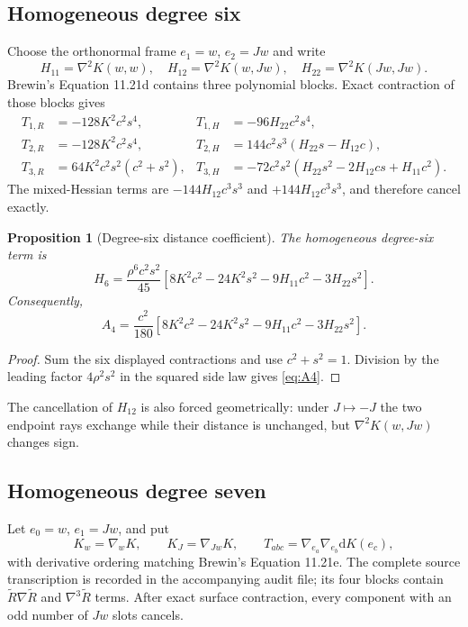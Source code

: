 \documentclass[11pt]{amsart}
\numberwithin{equation}{section}
\newtheorem{proposition}[theorem]{Proposition}
\theoremstyle{remark}
\newcommand{\BRiem}{\widetilde{R}}
\newcommand{\Hess}{\nabla^2}
\newcommand{\dd}{\mathrm{d}}
\begin{document}
\subsection{Homogeneous degree six}
Choose the orthonormal frame $e_1=w$, $e_2=Jw$ and write
\[
 H_{11}=\Hess K(w,w),\quad H_{12}=\Hess K(w,Jw),\quad H_{22}=\Hess K(Jw,Jw).
\]
Brewin's Equation 11.21d contains three polynomial blocks.  Exact contraction of those blocks gives
\begin{align*}
T_{1,R}&=-128K^2c^2s^4,
& T_{1,H}&=-96H_{22}c^2s^4,\\
T_{2,R}&=-128K^2c^2s^4,
& T_{2,H}&=144c^2s^3(H_{22}s-H_{12}c),\\
T_{3,R}&=64K^2c^2s^2(c^2+s^2),
& T_{3,H}&=-72c^2s^2(H_{22}s^2-2H_{12}cs+H_{11}c^2).
\end{align*}
The mixed-Hessian terms are $-144H_{12}c^3s^3$ and $+144H_{12}c^3s^3$, and therefore cancel exactly.

\begin{proposition}[Degree-six distance coefficient]\label{prop:H6}
The homogeneous degree-six term is
\begin{equation}\label{eq:H6}
 H_6=\frac{\rho^6c^2s^2}{45}
 \left[8K^2c^2-24K^2s^2-9H_{11}c^2-3H_{22}s^2\right].
\end{equation}
Consequently,
\begin{equation}\label{eq:A4}
 A_4=\frac{c^2}{180}
 \left[8K^2c^2-24K^2s^2-9H_{11}c^2-3H_{22}s^2\right].
\end{equation}
\end{proposition}

\begin{proof}
Sum the six displayed contractions and use $c^2+s^2=1$.  Division by the leading factor $4\rho^2s^2$ in the squared side law gives \eqref{eq:A4}.
\end{proof}

The cancellation of $H_{12}$ is also forced geometrically: under $J\mapsto-J$ the two endpoint rays exchange while their distance is unchanged, but $\Hess K(w,Jw)$ changes sign.

\subsection{Homogeneous degree seven}
Let $e_0=w$, $e_1=Jw$, and put
\[
 K_w=\nabla_wK,
 \qquad K_J=\nabla_{Jw}K,
 \qquad T_{abc}=\nabla_{e_a}\nabla_{e_b}\dd K(e_c),
\]
with derivative ordering matching Brewin's Equation 11.21e.  The complete source transcription is recorded in the accompanying audit file; its four blocks contain $\BRiem\nabla\BRiem$ and $\nabla^3\BRiem$ terms.  After exact surface contraction, every component with an odd number of $Jw$ slots cancels.
\end{document}
